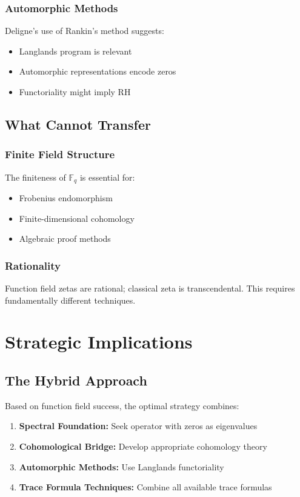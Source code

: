 \subsubsection{Automorphic Methods}

Deligne's use of Rankin's method suggests:
\begin{itemize}
\item Langlands program is relevant
\item Automorphic representations encode zeros
\item Functoriality might imply RH
\end{itemize}

\subsection{What Cannot Transfer}

\subsubsection{Finite Field Structure}

The finiteness of $\mathbb{F}_q$ is essential for:
\begin{itemize}
\item Frobenius endomorphism
\item Finite-dimensional cohomology
\item Algebraic proof methods
\end{itemize}

\subsubsection{Rationality}

Function field zetas are rational; classical zeta is transcendental. This requires fundamentally different techniques.

\section{Strategic Implications}
\label{sec:strategy}

\subsection{The Hybrid Approach}

Based on function field success, the optimal strategy combines:

\begin{enumerate}
\item \textbf{Spectral Foundation:} Seek operator with zeros as eigenvalues
\item \textbf{Cohomological Bridge:} Develop appropriate cohomology theory
\item \textbf{Automorphic Methods:} Use Langlands functoriality
\item \textbf{Trace Formula Techniques:} Combine all available trace formulas
\end{enumerate}

